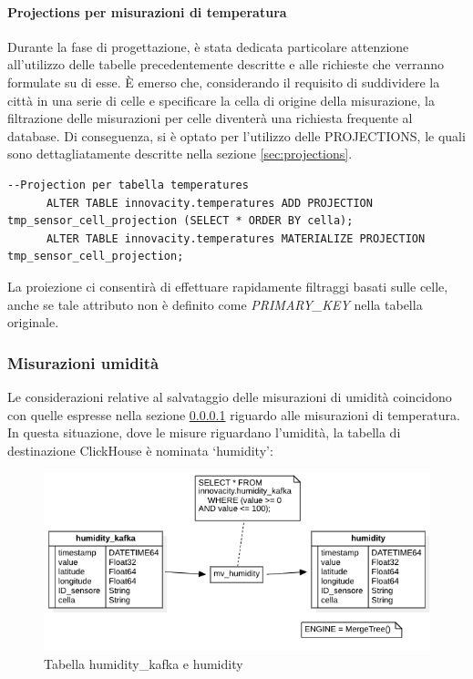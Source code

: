     \paragraph{Projections per misurazioni di temperatura} \label{sec:temp_projections}
    Durante la fase di progettazione, è stata dedicata particolare attenzione all'utilizzo delle tabelle precedentemente descritte e alle richieste che verranno formulate su di esse. È emerso che, considerando il requisito di suddividere la città in una serie di celle e specificare la cella di origine della misurazione, la filtrazione delle misurazioni per celle diventerà una richiesta frequente al database. Di conseguenza, si è optato per l'utilizzo delle PROJECTIONS, le quali sono dettagliatamente descritte nella sezione \ref{sec:projections}.
    \vspace{0,3cm}
    \begin{lstlisting}[caption={Esempio di proiezione e materializzazione in una tabella}, captionpos=b]
      --Projection per tabella temperatures
      ALTER TABLE innovacity.temperatures ADD PROJECTION tmp_sensor_cell_projection (SELECT * ORDER BY cella);
      ALTER TABLE innovacity.temperatures MATERIALIZE PROJECTION tmp_sensor_cell_projection;
  \end{lstlisting}
    \vspace{0,3cm}
    La proiezione ci consentirà di effettuare rapidamente filtraggi basati sulle celle, anche se tale attributo non è definito come \textit{PRIMARY\_KEY} nella tabella originale.

\subsubsection{Misurazioni umidità}
Le considerazioni relative al salvataggio delle misurazioni di umidità coincidono con quelle espresse nella sezione \ref{sec:temp_projections} riguardo alle misurazioni di temperatura.
In questa situazione, dove le misure riguardano l’umidità, la tabella di destinazione ClickHouse è nominata ‘humidity’:

\begin{figure}[H]
    \centering
    \includegraphics[width=1\textwidth]{../Images/SpecificaTecnica/humidity.png}
    \caption{Tabella humidity\_kafka e humidity}
    \label{fig:umidities}
  \end{figure}

